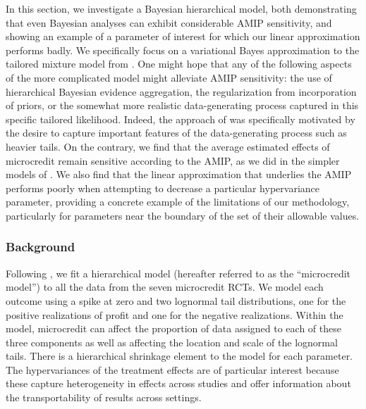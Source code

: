 

In this section, we investigate a Bayesian hierarchical model, both
demonstrating that even Bayesian analyses can exhibit considerable AMIP
sensitivity, and showing an example of a parameter of interest for which our
linear approximation performs badly. We specifically focus on a variational
Bayes approximation to the tailored mixture model from
\citet{meager2020aggregating}.  One might hope that any of the following aspects
of the more complicated model might alleviate AMIP sensitivity: the use of
hierarchical Bayesian evidence aggregation, the regularization from
incorporation of priors, or the somewhat more realistic data-generating process
captured in this specific tailored likelihood. Indeed, the approach of
\citet{meager2020aggregating} was specifically motivated by the desire to
capture important features of the data-generating process such as heavier tails.
On the contrary, we find that the average  estimated effects of microcredit
remain sensitive according to the AMIP, as we did in the simpler models of
.  We also find that the linear approximation
that underlies the AMIP performs poorly when attempting to decrease a particular
hypervariance parameter, providing a concrete example of the limitations of our
methodology, particularly for parameters near the boundary of the set of their
allowable values.

\subsubsection{Background}

Following \citet{meager2020aggregating}, we fit a hierarchical model (hereafter
referred to as the ``microcredit model'') to all the data from the seven
microcredit RCTs. We model each outcome using a spike at zero and two lognormal
tail distributions, one for the positive realizations of profit and one for the
negative realizations. Within the model, microcredit can affect the proportion
of data assigned to each of these three components as well as affecting the
location and scale of the lognormal tails. There is a hierarchical shrinkage
element to the model for each parameter. The hypervariances of the treatment
effects are of particular interest because these capture heterogeneity in
effects across studies and offer information about the transportability of
results across settings.

